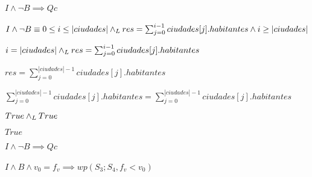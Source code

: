 \documentclass[10pt,a4paper]{article}
\begin{document}
\paragraph{$I \wedge \neg B \implies Qc$}
$I \wedge \neg B \equiv 0 \leq i \leq |ciudades| \land _L res = \sum_{j=0}^{i-1} ciudades[j].habitantes \wedge i \geq |ciudades| $ \equiv \par

\begin{center}
  $i = |ciudades| \land _L res = \sum_{j=0}^{i-1} ciudades[j].habitantes$ \equiv \par
\vspace{5px}  
$res = \sum_{j=0}^{|ciudades|-1} ciudades[j].habitantes$ \implies \par
\vspace{5px} 
$\sum_{j=0}^{|ciudades|-1} ciudades[j].habitantes = \sum_{j=0}^{|ciudades|-1} ciudades[j].habitantes$ \equiv \par
\vspace{5px}
$True \land _L True$ \equiv \par
\vspace{5px}
$True$\par
\vspace{5px}
$I \wedge \neg B \implies Qc$
\end{center}

\paragraph{$I \wedge  B \wedge v_{0}=f_{v} \implies wp(S_{3};S_{4}, f_{v} < v_{0})$}
\end{document}
